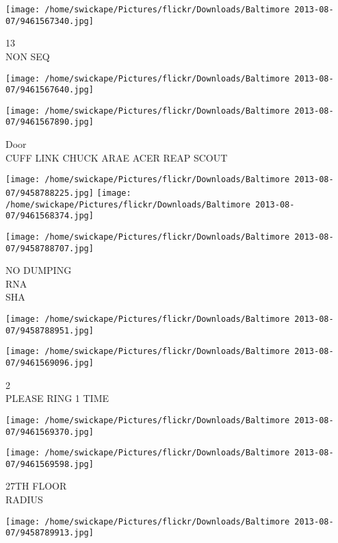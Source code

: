 \documentclass[10pt,letterpaper]{article}
\begin{document}
\vspace{0.25in}
\texttt{[image: /home/swickape/Pictures/flickr/Downloads/Baltimore 2013-08-07/9461567340.jpg]}

13\\
NON SEQ\\
\pagebreak

\texttt{[image: /home/swickape/Pictures/flickr/Downloads/Baltimore 2013-08-07/9461567640.jpg]}

\vspace{0.25in}
\texttt{[image: /home/swickape/Pictures/flickr/Downloads/Baltimore 2013-08-07/9461567890.jpg]}

Door\\
CUFF LINK CHUCK ARAE ACER REAP SCOUT\\
\pagebreak

\texttt{[image: /home/swickape/Pictures/flickr/Downloads/Baltimore 2013-08-07/9458788225.jpg]}
\texttt{[image: /home/swickape/Pictures/flickr/Downloads/Baltimore 2013-08-07/9461568374.jpg]}

\texttt{[image: /home/swickape/Pictures/flickr/Downloads/Baltimore 2013-08-07/9458788707.jpg]}

NO DUMPING\\
RNA\\
SHA\\
\pagebreak

\texttt{[image: /home/swickape/Pictures/flickr/Downloads/Baltimore 2013-08-07/9458788951.jpg]}

\vspace{0.25in}
\texttt{[image: /home/swickape/Pictures/flickr/Downloads/Baltimore 2013-08-07/9461569096.jpg]}

2\\
PLEASE RING 1 TIME\\
\pagebreak

\texttt{[image: /home/swickape/Pictures/flickr/Downloads/Baltimore 2013-08-07/9461569370.jpg]}

\vspace{0.25in}
\texttt{[image: /home/swickape/Pictures/flickr/Downloads/Baltimore 2013-08-07/9461569598.jpg]}

27TH FLOOR\\
RADIUS\\
\pagebreak

\texttt{[image: /home/swickape/Pictures/flickr/Downloads/Baltimore 2013-08-07/9458789913.jpg]}
\end{document}
